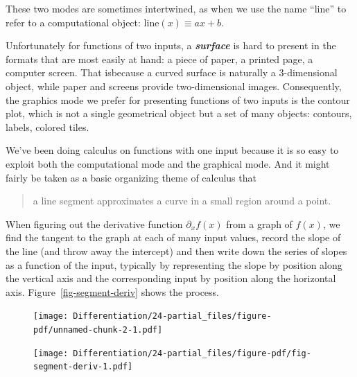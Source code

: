 \documentclass[
  letterpaper,
  DIV=11,
  numbers=noendperiod,
  oneside]{scrreprt}
\renewcommand{\line}{\text{line}}
\begin{document}
These two modes are sometimes intertwined, as when we use the name
``line'' to refer to a computational object:
\(\line(x) \equiv a x + b\).

Unfortunately for functions of two inputs, a \textbf{\emph{surface}} is
hard to present in the formats that are most easily at hand: a piece of
paper, a printed page, a computer screen. That isbecause a curved
surface is naturally a 3-dimensional object, while paper and screens
provide two-dimensional images. Consequently, the graphics mode we
prefer for presenting functions of two inputs is the contour plot, which
is not a single geometrical object but a set of many objects: contours,
labels, colored tiles.

We've been doing calculus on functions with one input because it is so
easy to exploit both the computational mode and the graphical mode. And
it might fairly be taken as a basic organizing theme of calculus that

\begin{quote}
a line segment approximates a curve in a small region around a point.
\end{quote}

When figuring out the derivative function \(\partial_x f(x)\) from a
graph of \(f(x)\), we find the tangent to the graph at each of many
input values, record the slope of the line (and throw away the
intercept) and then write down the series of slopes as a function of the
input, typically by representing the slope by position along the
vertical axis and the corresponding input by position along the
horizontal axis. Figure~\ref{fig-segment-deriv} shows the process.

\begin{figure}

{\centering \texttt{[image: Differentiation/24-partial\_files/figure-pdf/unnamed-chunk-2-1.pdf]}

}

\end{figure}

\begin{figure}


{\centering \texttt{[image: Differentiation/24-partial\_files/figure-pdf/fig-segment-deriv-1.pdf]}

}

\end{figure}
\end{document}
